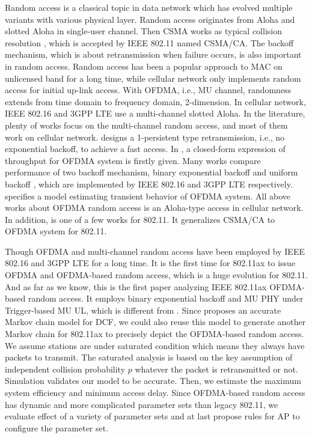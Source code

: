 Random access is a classical topic in data network which has evolved multiple variants with various physical layer.
Random access originates from Aloha and slotted Aloha in single-user channel. Then CSMA works as typical collision resolution  \cite{kleinrock1975packet}, which is accepted by IEEE 802.11 named CSMA/CA. 
The backoff mechanism, which is about retransmission when failure occurs, is also important in random access.
Random access has been a popular approach to MAC on unlicensed band for a long time, while cellular network  only implements random access for initial up-link access. 
With OFDMA, i.e., MU channel, randomness extends from time domain to frequency domain, 2-dimension. In cellular network, IEEE 802.16 and 3GPP LTE use a multi-channel slotted Aloha.
In the literature, plenty of works focus on the multi-channel random access, and most of them work on cellular network.
\cite{choi2006multichannel} designs a 1-persistent type retransmission, i.e., no exponential backoff, to achieve a fast access.  
In \cite{zhou2008efficient}, a closed-form expression of throughput for OFDMA system is firstly given.
Many works compare performance of two backoff mechanism, binary exponential backoff and uniform backoff  \cite{zhou2008efficient} \cite{seo2011design} \cite{kim2012performance}, which are implemented by IEEE 802.16 and 3GPP LTE respectively.  \cite{wei2015modeling} specifies a model estimating transient behavior of OFDMA system.
All above works about OFDMA random access is an Aloha-type access in cellular network.
In addition, \cite{GeneralizedOFDMACSMACA} is one of a few works for 802.11. It generalizes CSMA/CA to OFDMA system for 802.11.

Though OFDMA and multi-channel random access have been employed by IEEE 802.16 and 3GPP LTE for a long time.
It is the first time for 802.11ax to issue OFDMA and OFDMA-based random access, which is a huge evolution for 802.11.
And as far as we know, this is the first paper analyzing IEEE 802.11ax OFDMA-based random access. 
It employs binary exponential backoff and MU PHY under Trigger-based MU UL, which is different from \cite{GeneralizedOFDMACSMACA}.
Since \cite{bianchi2000performance} proposes an accurate Markov chain model for DCF, we could also reuse this model to generate another Markov chain for 802.11ax to precisely depict the OFDMA-based random access.
We assume stations are under saturated condition which means they always have packets to transmit.
The saturated analysis is based on the key assumption of independent collision probability $p$ whatever the packet is retransmitted or not.
Simulation validates our model to be accurate.
Then, we estimate the maximum system efficiency and minimum access delay. 
Since OFDMA-based random access has dynamic and more complicated parameter sets than legacy 802.11, we evaluate effect of a variety of parameter sets and at last propose rules for AP to configure the parameter set. 

